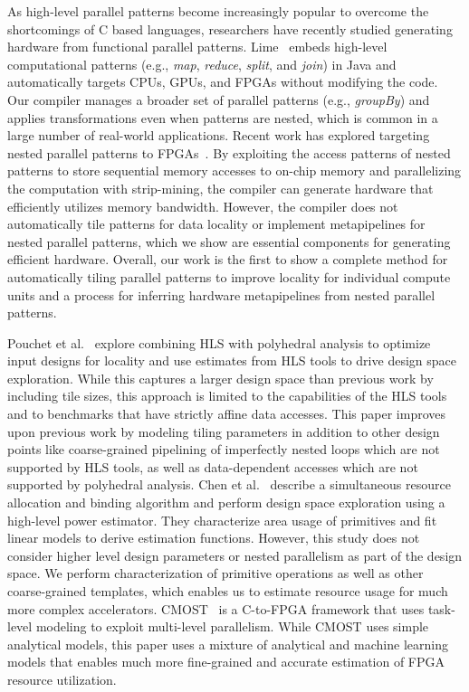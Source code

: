 As high-level parallel patterns become increasingly popular to overcome the
shortcomings of C based languages, researchers have recently studied generating
hardware from functional parallel patterns.  Lime~\cite{auerbach10lime}
embeds high-level computational patterns (e.g., \emph{map}, \emph{reduce}, \emph{split}, and \emph{join}) in
Java and automatically targets CPUs, GPUs, and FPGAs without modifying the
code.  Our compiler manages a broader set of parallel patterns (e.g., \emph{groupBy})
and applies transformations even when patterns are nested,
which is common in a large number of real-world applications.  Recent work has
explored targeting nested parallel patterns to
FPGAs~\cite{george14fpl}. By exploiting the access patterns of nested patterns
to store sequential memory accesses to on-chip memory and parallelizing the
computation with strip-mining, the compiler can generate hardware that
efficiently utilizes memory bandwidth.  However, the compiler does not
automatically tile patterns for data locality or implement metapipelines
for nested parallel patterns, which we show are essential components for generating efficient hardware. Overall, our work is the first to show a complete method for
automatically tiling parallel patterns to improve locality for individual compute units and a process
for inferring hardware metapipelines from nested parallel patterns.

Pouchet et al.~\cite{pouchet13fpga}
explore combining HLS with polyhedral analysis to optimize input designs for locality
and use estimates from HLS tools to drive design space exploration. While this captures a larger design
space than previous work by including tile sizes, this approach is limited to the capabilities
of the HLS tools and to benchmarks that have strictly affine data accesses. This paper improves
upon previous work by modeling tiling
parameters in addition to other design points like coarse-grained pipelining of imperfectly nested loops
which are not supported by HLS tools, as well as data-dependent accesses which are not supported by polyhedral analysis.
Chen et al.~\cite{cong_powerdse} describe a simultaneous resource allocation and binding algorithm
and perform design space exploration using a high-level power estimator. They characterize area
usage of primitives and fit linear models to derive estimation
functions. However, this study does not consider higher level design parameters or nested
parallelism as part of the design space. We perform characterization of primitive
operations as well as other coarse-grained templates, which enables us to estimate resource usage for
much more complex accelerators.
CMOST~\cite{cong_cmost} is a C-to-FPGA framework that uses task-level modeling
to exploit multi-level parallelism. While CMOST uses simple analytical models, this paper uses a mixture of
analytical and machine learning models that enables much more fine-grained and accurate estimation of FPGA resource utilization.

